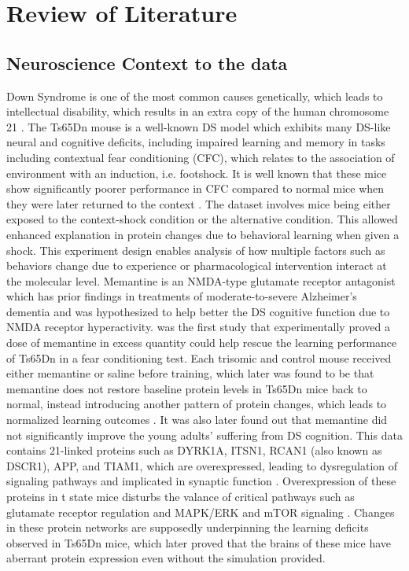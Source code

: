 \documentclass[a4paper,12pt]{article}
\begin{document}
\newpage

\section{Review of Literature}
\subsection{Neuroscience Context to the data}
Down Syndrome is one of the most common causes genetically, which leads to intellectual disability, which results in an extra copy of the human chromosome 21 \cite{ahmed2015protein}. The Ts65Dn mouse is a well-known DS model which exhibits many DS-like neural and cognitive deficits, including impaired learning and memory in tasks including contextual fear conditioning (CFC), which relates to the association of environment with an induction, i.e. footshock. It is well known that these mice show significantly poorer performance in CFC compared to normal mice when they were later returned to the context \cite{ahmed2015protein}. The dataset involves mice being either exposed to the context-shock condition or the alternative condition. \cite{higuera2015self} This allowed enhanced explanation in protein changes due to behavioral learning when given a shock. This experiment design enables analysis of how multiple factors such as behaviors change due to experience or pharmacological intervention interact at the molecular level.
\newline
Memantine is an NMDA-type glutamate receptor antagonist which has prior findings in treatments of moderate-to-severe Alzheimer's dementia \cite{ahmed2015protein} and was hypothesized to help better the DS cognitive function due to NMDA receptor hyperactivity. \cite{costa2008acute} was the first study that experimentally proved a dose of memantine in excess quantity could help rescue the learning performance of Ts65Dn in a fear conditioning test. Each trisomic and control mouse received either memantine or saline before training, which later was found to be that memantine does not restore baseline protein levels in Ts65Dn mice back to normal, instead introducing another pattern of protein changes, which leads to normalized learning outcomes \cite{ahmed2015protein}. It was also later found out that memantine did not significantly improve the young adults' suffering from DS cognition. \cite{ahmed2015protein}
\newline
This data contains 21-linked proteins such as DYRK1A, ITSN1, RCAN1 (also known as DSCR1), APP, and TIAM1, which are overexpressed, leading to dysregulation of signaling pathways and implicated in synaptic function \cite{ahmed2015protein}. Overexpression of these proteins in t state mice disturbs the valance of critical pathways such as glutamate receptor regulation and MAPK/ERK and mTOR signaling \cite{ahmed2015protein}. Changes in these protein networks are supposedly underpinning the learning deficits observed in Ts65Dn mice, which later proved that the brains of these mice have aberrant protein expression even without the simulation provided. 
\end{document}
